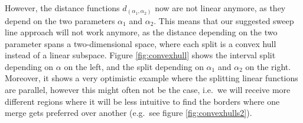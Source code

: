 However, the distance functions $d_{(\alpha_1, \alpha_2)}$ now are not linear anymore, as they depend on the two parameters $\alpha_1$ and $\alpha_2$. This means that our suggested sweep line approach will not work anymore, as the distance depending on the two parameter spans a two-dimensional space, where each split is a convex hull instead of a linear subspace. Figure \ref{fig:convexhull} shows the interval split depending on $\alpha$ on the left, and the split depending on $\alpha_1$ and $\alpha_2$ on the right. Moreover, it shows a very optimistic example where the splitting linear functions are parallel, however this might often not be the case, i.e.\ we will receive more different regions where it will be less intuitive to find the borders where one merge gets preferred over another (e.g.\ see figure \ref{fig:convexhulls2}).

